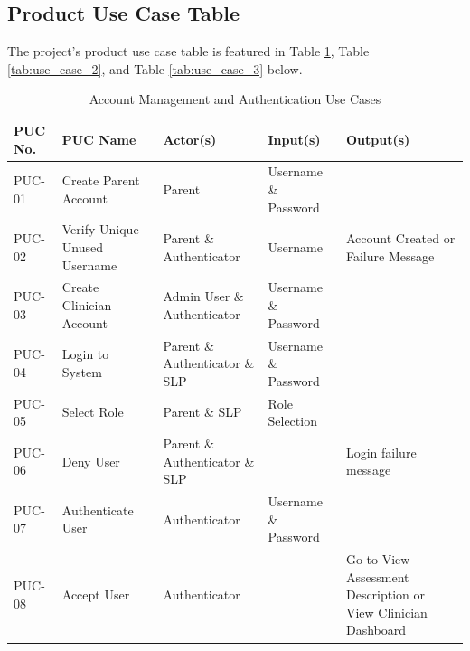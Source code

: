 \documentclass[12pt]{article}
\begin{document}
\newpage

\subsection{Product Use Case Table}
\hspace{2em} The project's product use case table is featured in Table \ref{tab:use_case_1}, Table \ref{tab:use_case_2}, and Table \ref{tab:use_case_3} below.

\begin{table}[H]
\centering
\caption{Account Management and Authentication Use Cases}
\label{tab:use_case_1}
\begin{tabular}{|p{2cm}|p{3.2cm}|p{3.2cm}|p{3cm}|p{3cm}|}
  \hline
  \textbf{PUC No.} & \textbf{PUC Name} & \textbf{Actor(s)} & \textbf{Input(s)} & \textbf{Output(s)} \\
  \hline
  PUC-01 & Create Parent Account & Parent & Username \& Password & \\  
  \hline
  PUC-02 & Verify Unique Unused Username & Parent \& Authenticator & Username & Account Created or Failure Message \\  
  \hline
  PUC-03 & Create Clinician Account & Admin User \& Authenticator & Username \& Password & \\  
  \hline
  PUC-04 & Login to System & Parent \& Authenticator \& SLP & Username \& Password & \\  
  \hline
  PUC-05 & Select Role & Parent \& SLP & Role Selection & \\  
  \hline
  PUC-06 & Deny User & Parent \& Authenticator \& SLP & & Login failure message \\  
  \hline
  PUC-07 & Authenticate User & Authenticator & Username \& Password & \\  
  \hline
  PUC-08 & Accept User & Authenticator & & Go to View Assessment Description or View Clinician Dashboard \\  
  \hline
\end{tabular}
\end{table}
\end{document}
